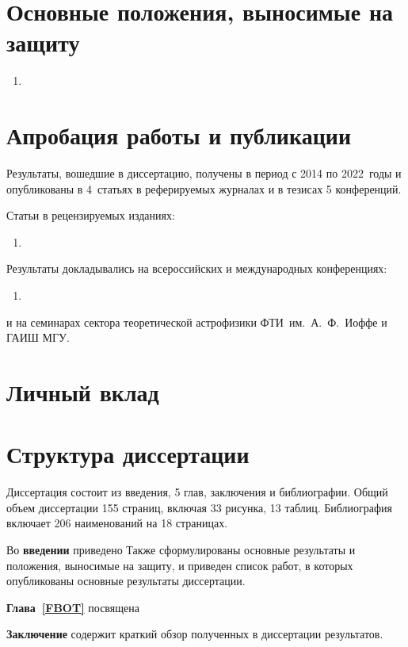 \section*{Основные положения, выносимые на защиту}

\begin{enumerate}
\item 
\end{enumerate}

\section*{Апробация работы и публикации}
Результаты, вошедшие в диссертацию, получены в период с 2014 по 2022~годы и 
опубликованы в 4~статьях в реферируемых журналах и в тезисах 5 конференций. 

Статьи в рецензируемых изданиях:
\begin{enumerate}
\item %


\end{enumerate}

Результаты докладывались на всероссийских и международных конференциях: 
\begin{enumerate}
\item 
\end{enumerate}
и на семинарах сектора теоретической астрофизики ФТИ~им.~А.~Ф.~Иоффе и ГАИШ МГУ.

\section*{Личный вклад}


\section*{Структура диссертации}
Диссертация состоит из введения, 5 глав, заключения и библиографии.
Общий объем диссертации 155 страниц, включая 33 рисунка, 13 таблиц. 
Библиография включает 206 наименований на 18 страницах.

Во \textbf{введении} приведено 
Также сформулированы основные результаты и положения, выносимые на защиту, и приведен
список работ, в которых опубликованы основные результаты диссертации.

\textbf{Глава~\ref{FBOT}} посвящена

  
\enlargethispage{4\baselineskip}
\textbf{Заключение} содержит краткий обзор полученных в диссертации результатов.

\clearpage
